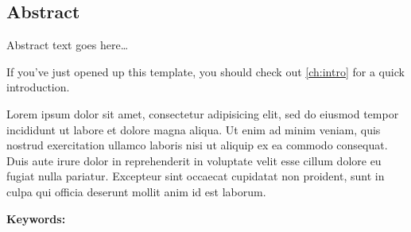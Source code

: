 \thispagestyle{fancy}
\fancyhf{}
\renewcommand{\headrulewidth}{0pt}
\fancyfoot[C]{\thepage}
\vspace*{\fill}

\begin{center}
    \section*{Abstract}
\end{center}
Abstract text goes here\dots{}

If you've just opened up this template, you should check out \autoref{ch:intro} for a quick introduction. 

Lorem ipsum dolor sit amet, consectetur adipisicing elit, sed do eiusmod tempor incididunt ut
labore et dolore magna aliqua. Ut enim ad minim veniam, quis nostrud exercitation ullamco
laboris nisi ut aliquip ex ea commodo consequat. Duis aute irure dolor in reprehenderit in
voluptate velit esse cillum dolore eu fugiat nulla pariatur. Excepteur sint occaecat cupidatat
non proident, sunt in culpa qui officia deserunt mollit anim id est laborum.

\textbf{Keywords:} \tkeywords

\vspace*{\fill}



